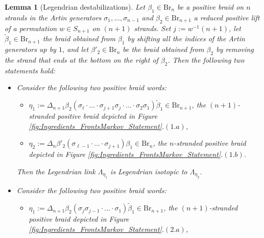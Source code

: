 \documentclass[10pt]{amsart}
\theoremstyle{plain}
\newtheorem{lemma}[thm]{Lemma}
\theoremstyle{definition}
\theoremstyle{remark}
\numberwithin{equation}{section}
\newcommand{\La}{\Lambda}
\newcommand{\Br}{\mathrm{Br}}
\newcommand{\MG}[1]{{\color{teal}{{\bf Misha}: #1}}}
\begin{document}
\begin{lemma}[Legendrian destabilizations]\label{lem:Markov} Let $\beta_1\in\Br_n$ be a positive braid on $n$ strands in the Artin generators $\sigma_1,\ldots,\sigma_{n-1}$ and $\beta_2\in\Br_{n+1}$ a reduced positive lift of a permutation $w\in S_{n+1}$ on $(n+1)$ strands. Set $j:=w^{-1}(n+1)$, let $\tilde{\beta}_1 \in \Br_{n+1}$ the braid obtained from $\beta_1$ %
by shifting all the indices of the Artin generators up by $1$, and let $\beta'_2 \in \Br_n$ be the braid obtained from $\beta_2$ by removing the strand that ends at the bottom on the right of $\beta_2$. Then the following two statements hold:


\begin{itemize}
    \item[$(1)$] Consider the following two positive braid words:\\
    
    \begin{itemize}
        \item[(a)] $\eta_1 := \Delta_{n+1}\beta_2 (\sigma_{\ell}\cdot\ldots\cdot\sigma_{j+1}\sigma_j\cdot\ldots\cdot\sigma_2\sigma_1)\tilde{\beta}_1 \in \Br_{n+1}$, the $(n+1)$-stranded positive braid depicted in Figure \ref{fig:Ingredients_FrontsMarkov_Statement}.$(1.a)$,\\

        \item[(b)] $\eta_2:=\Delta_n\beta'_2(\sigma_{\ell - 1}\cdot\ldots\cdot\sigma_{j+1})\beta_1 \in \Br_n$, the $n$-stranded positive braid depicted in Figure \ref{fig:Ingredients_FrontsMarkov_Statement}.$(1.b)$.
        \\
    \end{itemize} 

\noindent Then the Legendrian link $\La_{\eta_1}$ is Legendrian isotopic to $\La_{\eta_2}$.\\

     \item[$(2)$] Consider the following two positive braid words:\\
    
    \begin{itemize}
        \item[(a)] $\eta_1:=\Delta_{n+1}\beta_2(\sigma_{j}\sigma_{j-1}\cdot\ldots\cdot\sigma_1)\tilde{\beta}_1 \in \Br_{n+1}$, the $(n+1)$-stranded positive braid depicted in Figure \ref{fig:Ingredients_FrontsMarkov_Statement}.$(2.a)$,\\


\end{itemize}
\end{itemize}
\end{lemma}
\end{document}
